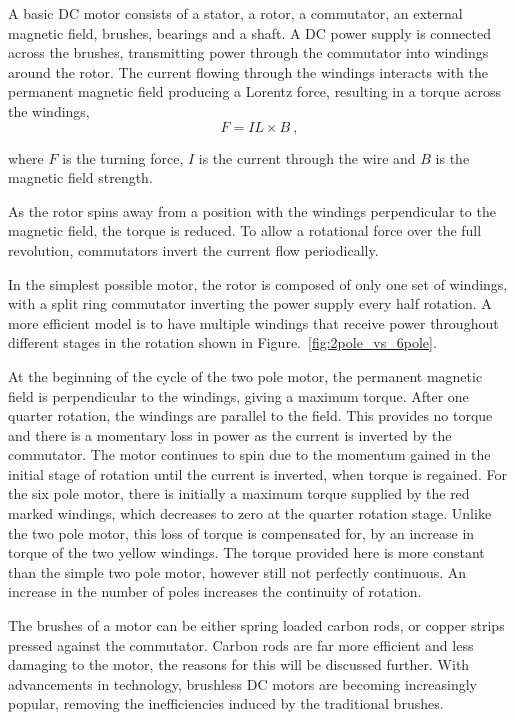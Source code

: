 A basic DC motor consists of a stator, a rotor, a commutator, an external magnetic field, brushes, bearings and a shaft. A DC power supply is connected across the brushes, transmitting power through the commutator into windings around the rotor. The current flowing through the windings interacts with the permanent magnetic field producing a Lorentz force, resulting in a torque across the windings,
\begin{equation}
    F = I L \times B~,
    \label{Lorentz}
\end{equation}

where $F$ is the turning force, $I$ is the current through the wire and $B$ is the magnetic field strength.

As the rotor spins away from a position with the windings perpendicular to the magnetic field, the torque is reduced. To allow a rotational force over the full revolution, commutators invert the current flow periodically. 

In the simplest possible motor, the rotor is composed of only one set of windings, with a split ring commutator inverting the power supply every half rotation. A more efficient model is to have multiple windings that receive power throughout different stages in the rotation shown in Figure.~\ref{fig:2pole_vs_6pole}. 

At the beginning of the cycle of the two pole motor, the permanent magnetic field is perpendicular to the windings, giving a maximum torque. After one quarter rotation, the windings are parallel to the field. This provides no torque and there is a momentary loss in power as the current is inverted by the commutator. The motor continues to spin due to the momentum gained in the initial stage of rotation until the current is inverted, when torque is regained. For the six pole motor, there is initially a maximum torque supplied by the red marked windings, which decreases to zero at the quarter rotation stage. Unlike the two pole motor, this loss of torque is compensated for, by an increase in torque of the two yellow windings. The torque provided here is more constant than the simple two pole motor, however still not perfectly continuous. An increase in the number of poles increases the continuity of rotation.

The brushes of a motor can be either spring loaded carbon rods, or copper strips pressed against the commutator. Carbon rods are far more efficient and less damaging to the motor, the reasons for this will be discussed further. With advancements in technology, brushless DC motors are becoming increasingly popular, removing the inefficiencies induced by the traditional brushes. 

